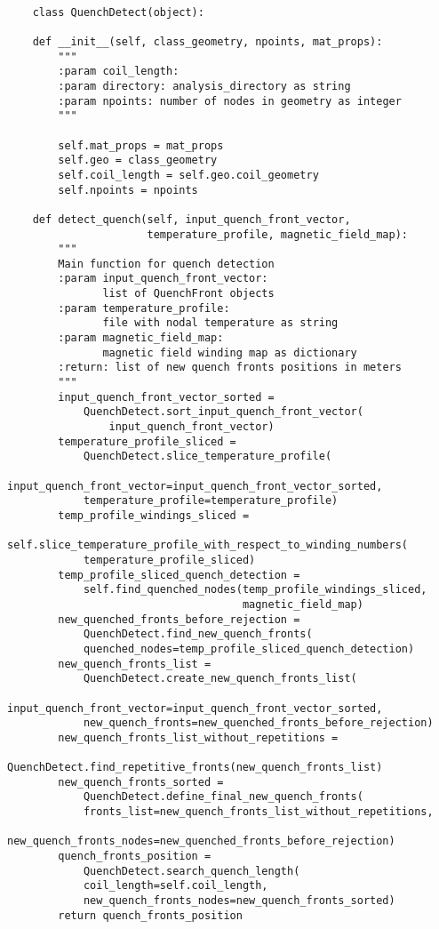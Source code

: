 
\begin{verbatim}
    
    class QuenchDetect(object):

    def __init__(self, class_geometry, npoints, mat_props):
        """
        :param coil_length:
        :param directory: analysis_directory as string
        :param npoints: number of nodes in geometry as integer
        """

        self.mat_props = mat_props
        self.geo = class_geometry
        self.coil_length = self.geo.coil_geometry
        self.npoints = npoints

    def detect_quench(self, input_quench_front_vector, 
                      temperature_profile, magnetic_field_map):
        """
        Main function for quench detection
        :param input_quench_front_vector: 
               list of QuenchFront objects
        :param temperature_profile: 
               file with nodal temperature as string
        :param magnetic_field_map: 
               magnetic field winding map as dictionary
        :return: list of new quench fronts positions in meters
        """
        input_quench_front_vector_sorted = 
            QuenchDetect.sort_input_quench_front_vector(
                input_quench_front_vector)
        temperature_profile_sliced = 
            QuenchDetect.slice_temperature_profile(
            input_quench_front_vector=input_quench_front_vector_sorted, 
            temperature_profile=temperature_profile)
        temp_profile_windings_sliced = 
            self.slice_temperature_profile_with_respect_to_winding_numbers(
            temperature_profile_sliced)
        temp_profile_sliced_quench_detection = 
            self.find_quenched_nodes(temp_profile_windings_sliced, 
                                     magnetic_field_map)
        new_quenched_fronts_before_rejection = 
            QuenchDetect.find_new_quench_fronts(
            quenched_nodes=temp_profile_sliced_quench_detection)
        new_quench_fronts_list = 
            QuenchDetect.create_new_quench_fronts_list(
            input_quench_front_vector=input_quench_front_vector_sorted, 
            new_quench_fronts=new_quenched_fronts_before_rejection)
        new_quench_fronts_list_without_repetitions = 
            QuenchDetect.find_repetitive_fronts(new_quench_fronts_list)
        new_quench_fronts_sorted = 
            QuenchDetect.define_final_new_quench_fronts(
            fronts_list=new_quench_fronts_list_without_repetitions, 
            new_quench_fronts_nodes=new_quenched_fronts_before_rejection)
        quench_fronts_position = 
            QuenchDetect.search_quench_length(
            coil_length=self.coil_length, 
            new_quench_fronts_nodes=new_quench_fronts_sorted)
        return quench_fronts_position


\end{verbatim}
